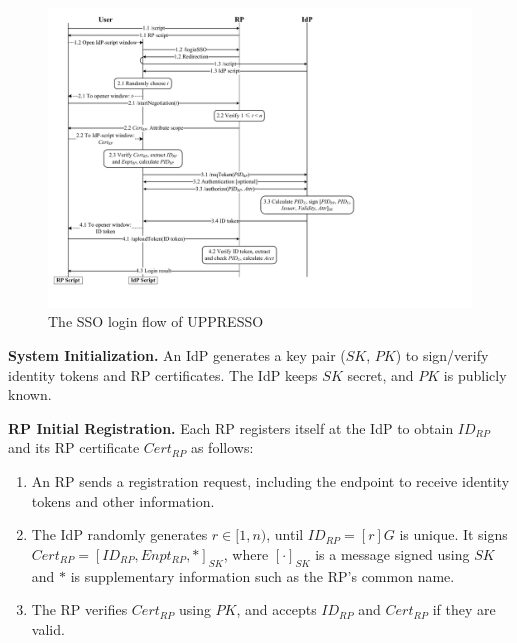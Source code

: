 \begin{figure}[bt]
  \centering
  \includegraphics[height=0.575\textheight]{fig/process-js.pdf}
  \caption{The SSO login flow of UPPRESSO}
  \label{fig:process}
\end{figure}


\noindent \textbf{System Initialization.}
An IdP generates a key pair ($SK$, $PK$) to sign/verify identity tokens and RP certificates.
The IdP keeps $SK$ secret, and $PK$ is publicly known.


\vspace{0.5mm}
\noindent\textbf{RP Initial Registration.}
Each RP registers itself at the IdP to obtain $ID_{RP}$
 and its RP certificate $Cert_{RP}$ as follows:
\vspace{-\topsep}\begin{enumerate}
\setlength{\topsep}{0pt}
\setlength{\partopsep}{0pt}
\setlength{\itemsep}{0pt}
\setlength{\parsep}{0pt}
\setlength{\parskip}{0pt}
\item
An RP sends a registration request, including the endpoint to receive identity tokens
    and other information.
\item
The IdP randomly generates $r \in [1,n)$, until $ID_{RP} = [r]G$ is unique.
It signs $Cert_{RP} = [ID_{RP}, Enpt_{RP}, *]_{SK}$,
     where $[\cdot]_{SK}$ is a message signed using $SK$ and $*$ is supplementary information such as the RP's common name.
\item
The RP verifies $Cert_{RP}$ using $PK$,
    and accepts $ID_{RP}$ and $Cert_{RP}$ if they are valid.
\end{enumerate}

